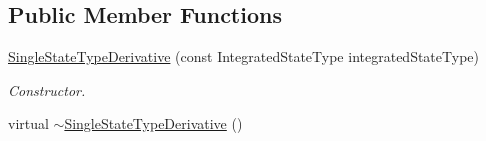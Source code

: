 \subsection*{Public Member Functions}
\begin{DoxyCompactItemize}
\item 
\hyperlink{classtudat_1_1propagators_1_1SingleStateTypeDerivative_acbb10b6a3ae3413f136520475f93ceab}{Single\+State\+Type\+Derivative} (const Integrated\+State\+Type integrated\+State\+Type)
\begin{DoxyCompactList}\small\item\em Constructor. \end{DoxyCompactList}\item 
virtual \hyperlink{classtudat_1_1propagators_1_1SingleStateTypeDerivative_a08576def80c16bfe0169693d1abc0dfc}{$\sim$\+Single\+State\+Type\+Derivative} ()\hypertarget{classtudat_1_1propagators_1_1SingleStateTypeDerivative_a08576def80c16bfe0169693d1abc0dfc}{}\label{classtudat_1_1propagators_1_1SingleStateTypeDerivative_a08576def80c16bfe0169693d1abc0dfc}


\end{DoxyCompactItemize}
